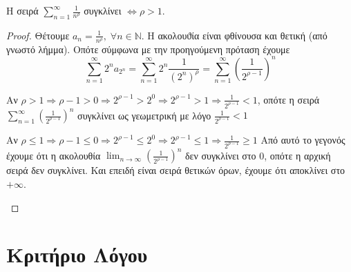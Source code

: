 \begin{cor}
    Η σειρά $ \sum_{n=1}^{\infty} \frac{1}{n^{\rho}} $ συγκλίνει $ \Leftrightarrow 
    \rho > 1$.
\end{cor}
\begin{proof}
\item {}
    Θέτουμε $ a_{n}= \frac{1}{n^{\rho}}, \; \forall n \in \mathbb{N} $. Η 
    ακολουϑία είναι φθίνουσα και θετική (από γνωστό λήμμα). Οπότε σύμφωνα 
    με την προηγούμενη πρόταση έχουμε
    \[
        \sum_{n=1}^{\infty} 2^{n} a_{2^{n}} = \sum_{n=1}^{\infty} 2 ^{n} 
        \frac{1}{(2^{n})^{\rho}} = \sum_{n=1}^{\infty} \left(\frac{1}{2^{\rho -1}} 
        \right)^{n}
    \] 
    \begin{myitemize}
    \item Αν $ \rho >1 \Rightarrow \rho -1 >0 \Rightarrow 2^{\rho -1} > 2^{0} 
        \Rightarrow 2^{\rho -1} > 1 \Rightarrow \frac{1}{2^{\rho -1}} < 1 $, οπότε
        η σειρά $ \sum_{n=1}^{\infty} \left(\frac{1}{2^{\rho -1}} \right)^{n} $ 
        συγκλίνει ως γεωμετρική με λόγο $ \frac{1}{2^{\rho -1}} < 1 $
    \item Αν $ \rho \leq 1 \Rightarrow \rho -1 \leq 0 \Rightarrow 2^{\rho -1} \leq 
        2^{0} \Rightarrow 2^{\rho -1} \leq 1 \Rightarrow \frac{1}{2^{\rho -1}} \geq 1 $
        Από αυτό το γεγονός έχουμε ότι η ακολουθία 
        $ \lim_{n \to \infty} \left(\frac{1}{2^{\rho -1}}\right)^{n} $ 
        δεν συγκλίνει στο 0, οπότε η αρχική σειρά δεν συγκλίνει. Και επειδή είναι 
        σειρά θετικών όρων, έχουμε ότι αποκλίνει στο $ + \infty $.
    \end{myitemize}
\end{proof}

\section{Κριτήριο Λόγου}


